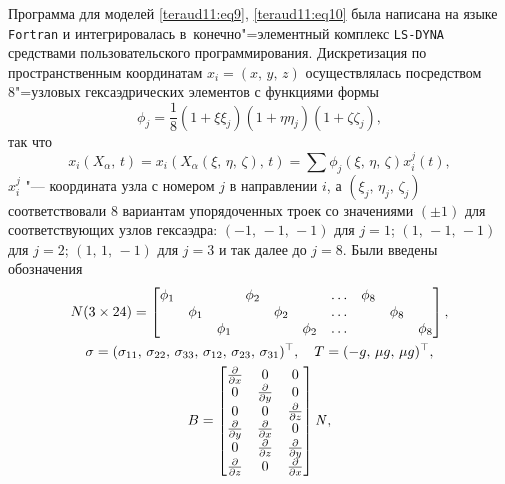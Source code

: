Программа для моделей \eqref{teraud11:eq9}, \eqref{teraud11:eq10} была написана на языке {\tt Fortran} и интегрировалась в~конечно"=элементный комплекс {\tt LS-DYNA} средствами пользовательского программирования. 
Дискретизация по пространственным координатам $x_i =(x,\,y,\,z)$ осуществлялась посредством 8"=узловых гексаэдрических элементов с функциями формы
\[
\phi_{j} =\frac{1}{8} (1+\xi \xi _{j} )(1+\eta \eta _{j} )(1+\zeta \zeta _{j}),
\]
так что
\begin{equation}
\label{teraud11:eq11}
x_{i} (X_{\alpha},\, t) = x_{i} (X_{\alpha } (\xi,\, \eta ,\, \zeta ),\,  t ) = \sum \phi_{j} (\xi,\, \eta ,\,\zeta ) x_{i}^{j} (t),
\end{equation}
$x_i^j $ "---  координата узла с номером $j$ в направлении $i$, а $(\xi_j,\,\eta_j,\,\zeta_j)$  соответствовали 8 вариантам упорядоченных
троек со значениями $(\pm 1)$ для соответствующих узлов гексаэдра: $(-1,\,-1,\,-1)$ для $j=1$; $(1,\, -1,\,-1)$ для $j=2$; $(1,\,1,\,-1)$
для  $j=3$ и так далее до $j=8$. 
Были введены обозначения
\begin{gather*}
N(3\times 24)=\begin{bmatrix}
\phi_{1} & {}      & {}     & \phi_2 &         &       & \ldots & \phi_8 &        &  \\
{}       & \phi_1  & {}     &  {}    & \phi_2  &       & \ldots &        & \phi_8 &   \\
         &         & \phi_1 &        &         & \phi_2 & \ldots &        &        & \phi_8
\end{bmatrix},\\
\sigma=(\sigma_{11},\,\sigma_{22},\,\sigma_{33},\,\sigma_{12},\,\sigma_{23},\,\sigma_{31})^\top,\quad 
T=(-g,\,\mu g,\, \mu g)^\top,\\
B= \begin{bmatrix}
\frac{\partial }{\partial x}  &               0              & 0 \\
0                             & \frac{\partial }{\partial y} & 0 \\
0                             &              0               & \frac{\partial }{\partial z} \\
\frac{\partial }{\partial y}  & \frac{\partial }{\partial x} & 0 \\
0                             & \frac{\partial }{\partial z} & \frac{\partial }{\partial y} \\
\frac{\partial }{\partial z}  & 0                            & \frac{\partial }{\partial x}
\end{bmatrix} \it N,
\end{gather*}

